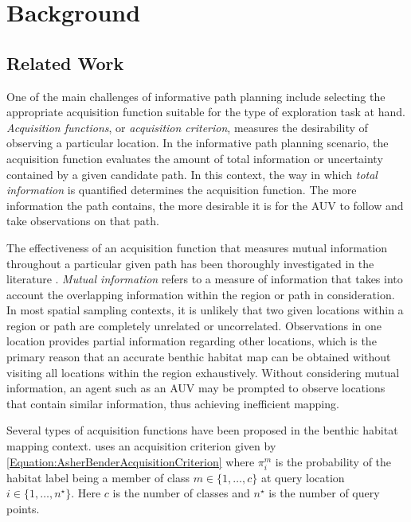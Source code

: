 \chapter{Background}
\label{Background}

	\section{Related Work}
	\label{Background:RelatedWork}
	
		One of the main challenges of informative path planning include selecting the appropriate acquisition function suitable for the type of exploration task at hand. \textit{Acquisition functions}, or \textit{acquisition criterion}, measures the desirability of observing a particular location. In the informative path planning scenario, the acquisition function evaluates the amount of total information or uncertainty contained by a given candidate path. In this context, the way in which \textit{total information} is quantified determines the acquisition function. The more information the path contains, the more desirable it is for the AUV to follow and take observations on that path. 

		The effectiveness of an acquisition function that measures mutual information throughout a particular given path has been thoroughly investigated in the literature \citep{AsherBender, Rigby:ROB20372, Krause:2008:NSP:1390681.1390689, Kapoor}. \textit{Mutual information} refers to a measure of information that takes into account the overlapping information within the region or path in consideration. In most spatial sampling contexts, it is unlikely that two given locations within a region or path are completely unrelated or uncorrelated. Observations in one location provides partial information regarding other locations, which is the primary reason that an accurate benthic habitat map can be obtained without visiting all locations within the region exhaustively. Without considering mutual information, an agent such as an AUV may be prompted to observe locations that contain similar information, thus achieving inefficient mapping.
		
		Several types of acquisition functions have been proposed in the benthic habitat mapping context. \cite{AsherBender} uses an acquisition criterion given by \eqref{Equation:AsherBenderAcquisitionCriterion} where $\pi^{m}_{i}$ is the probability of the habitat label being a member of class $m \in \{1, \dots, c\}$ at query location $i \in \{1, \dots, n^{\star}\}$. Here $c$ is the number of classes and $n^{\star}$ is the number of query points.
		
